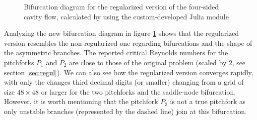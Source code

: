 \begin{figure}[!htb]
  \caption{Bifurcation diagram for the regularized version of the four-sided
    cavity flow, calculated by using the custom-developed Julia module} 
  \label{fig:bif_diag}
\end{figure}

Analyzing the new bifurcation diagram in figure \ref{fig:bif_diag} shows that
the regularized version resembles the non-regularized one regarding
bifurcations and the shape of the asymmetric branches. The reported critical
Reynolds numbers for the pitchforks $P_1$ and $P_2$ are close to those of the
original problem (scaled by $2$, see section \ref{sec:regul}). We can also see
how the regularized version converges rapidly, with only the changes third
decimal digits (or smaller) changing from a grid of size $48 \times 48$ or
larger for the two pitchforks and the saddle-node bifurcation. However, it is
worth mentioning that the pitchfork $P_2$ is not a true pitchfork as only
unstable branches (represented by the dashed line) join at this bifurcation.

